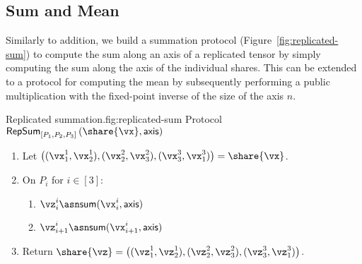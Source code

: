 \subsection{Sum and Mean}

Similarly to addition, we build a summation protocol (Figure~\ref{fig:replicated-sum}) to compute the sum along an axis of a replicated tensor by simply computing the sum along the axis of the individual shares. This can be extended to a protocol for computing the mean by subsequently performing a public multiplication with the fixed-point inverse of the size of the axis $n$.


\begin{Boxfig}{Replicated summation.}{fig:replicated-sum}
  {Protocol $\mathsf{RepSum}_{[P_1, P_2, P_3]}\left(\share{\vx}, \mathsf{axis} \right)$}
  
  \begin{enumerate}
  \item Let $\left( (\vx_1^1, \vx_2^1), (\vx_2^2, \vx_3^2), (\vx_3^3, \vx_1^3) \right) = \share{\vx}$.
  
  \item On $P_i$ for $i \in [3]$:
  \begin{enumerate}
    \item $\vz_i^i \asn \mathsf{sum}(\vx_i^i, \mathsf{axis})$
    \item $\vz_{i+1}^i \asn \mathsf{sum}(\vx_{i+1}^i, \mathsf{axis})$
  \end{enumerate}
  
  \item Return $\share{\vz} = \left( (\vz_1^1, \vz_2^1), (\vz_2^2, \vz_3^2), (\vz_3^3, \vz_1^3) \right)$.
  \end{enumerate}
\end{Boxfig}
